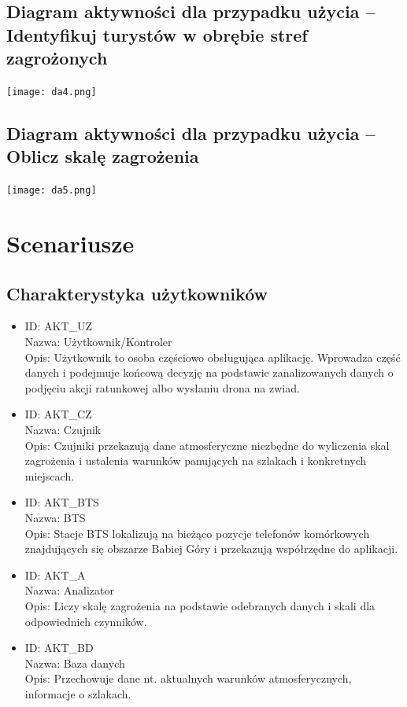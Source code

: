 \documentclass[a4paper,12pt]{article}
\begin{document}
\subsection{Diagram aktywności dla przypadku użycia -- Identyfikuj turystów w obrębie stref zagrożonych}
\texttt{[image: da4.png]}
\newpage
\subsection{Diagram aktywności dla przypadku użycia -- Oblicz skalę zagrożenia}
\texttt{[image: da5.png]}
\section{Scenariusze}
\subsection{Charakterystyka użytkowników}
\begin{itemize}
\item ID: AKT\_UZ\\
Nazwa: Użytkownik/Kontroler\\
Opis: Użytkownik to osoba częściowo obsługująca aplikację. Wprowadza
część danych i podejmuje końcową decyzję na podstawie zanalizowanych
danych o podjęciu akcji ratunkowej albo wysłaniu drona na zwiad.
\item ID: AKT\_CZ\\
Nazwa: Czujnik\\
Opis: Czujniki przekazują dane atmosferyczne niezbędne do wyliczenia skal
zagrożenia i ustalenia warunków panujących na szlakach i konkretnych
miejscach.
\item ID: AKT\_BTS\\
Nazwa: BTS\\
Opis: Stacje BTS lokalizują na bieżąco pozycje telefonów komórkowych
znajdujących się obszarze Babiej Góry i przekazują współrzędne do aplikacji.
\item ID: AKT\_A\\
Nazwa: Analizator\\
Opis: Liczy skalę zagrożenia na podstawie odebranych danych i skali dla
odpowiednich czynników.
\item ID: AKT\_BD\\
Nazwa: Baza danych\\
Opis: Przechowuje dane nt. aktualnych warunków atmosferycznych,
informacje o szlakach.
\end{itemize}
\newpage
\end{document}

